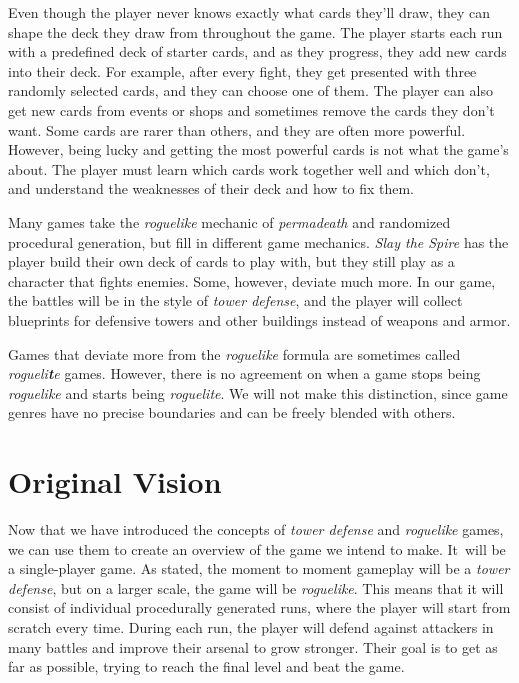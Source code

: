 Even though the player never knows exactly what cards they'll draw, they can shape the deck they draw from throughout the game.
The player starts each run with a predefined deck of starter cards, and as they progress, they add new cards into their deck.
For example, after every fight, they get presented with three randomly selected cards, and they can choose one of them.
The player can also get new cards from events or shops and sometimes remove the cards they don't want.
Some cards are rarer than others, and they are often more powerful.
However, being lucky and getting the most powerful cards is not what the game's about.
The player must learn which cards work together well and which don't, and understand the weaknesses of their deck and how to fix them.

Many games take the \emph{roguelike} mechanic of \emph{permadeath} and randomized procedural generation, but fill in different game mechanics.
\emph{Slay the Spire} has the player build their own deck of cards to play with, but they still play as a character that fights enemies.
Some, however, deviate much more.
In our game, the battles will be in the style of \emph{tower defense}, and the player will collect blueprints for defensive towers and other buildings instead of weapons and armor.

Games that deviate more from the \emph{roguelike} formula are sometimes called \emph{rogueli\textbf{t}e} games.
However, there is no agreement on when a game stops being \emph{roguelike} and starts being \emph{roguelite}.
We will not make this distinction, since game genres have no precise boundaries and can be freely blended with others.

\section{Original Vision} \label{sec:original-vision}

Now that we have introduced the concepts of \emph{tower defense} and \emph{roguelike} games, we can use them to create an overview of the game we intend to make.
It~will be a single-player game.
As stated, the moment to moment gameplay will be a \emph{tower defense}, but on a larger scale, the game will be \emph{roguelike}.
This means that it will consist of individual procedurally generated runs, where the player will start from scratch every time.
During each run, the player will defend against attackers in many battles and improve their arsenal to grow stronger.
Their goal is to get as far as possible, trying to reach the final level and beat the game.

